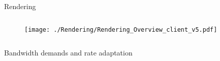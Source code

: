 \documentclass[mathserif]{beamer}
\begin{document}
	\begin{frame} {Rendering}
		\vspace{10pt}
		\begin{columns}
			\begin{column}{1\linewidth}
				
				\begin{figure}
					\texttt{[image: ./Rendering/Rendering\_Overview\_client\_v5.pdf]}
				\end{figure}
			\end{column}
		\end{columns}
		
		\vspace{5mm}
		Bandwidth demands and rate adaptation
		
		
	\end{frame}
	
	
	
\end{document}
